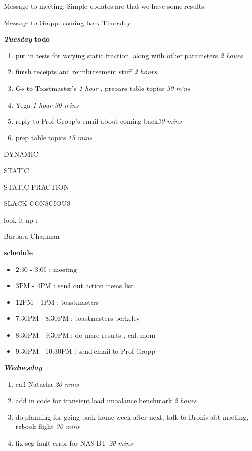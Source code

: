 \documentclass[11pt]{article}
\newcommand{\timeEst}[1]{\textit{#1}}
\begin{document}
Message to meeting: Simple updates are that we have some results

Message to Gropp: coming back Thursday

\textbf{\textit{Tuesday}}
\textbf{todo}
\begin{enumerate}
\item put in tests for varying static fraction, along with other parameters \timeEst{2 hours}
\item finish receipts and reimbursement stuff \timeEst{2 hours}
\item Go to Toastmaster's \timeEst{1 hour} , prepare table topics \timeEst{30 mins}
\item Yoga \timeEst{1 hour 30 mins}
\item reply to Prof Gropp's email about coming back\timeEst{20 mins}
\item prep table topics \timeEst{15 mins}
\end{enumerate}

DYNAMIC

STATIC

STATIC FRACTION

SLACK-CONSCIOUS


look it up :

Barbara Chapman


\textbf{schedule}
\begin{itemize}
\item 2:30 - 3:00 :  meeting
\item 3PM - 4PM : send out action items list
\item 12PM - 1PM : toastmasters
\item 7:30PM - 8:30PM : toastmasters berkeley
\item 8:30PM - 9:30PM :  do more results , call mom
\item 9:30PM - 10:30PM : send email to Prof Gropp
\end{itemize}


\textbf{\textit{Wednesday}}
\begin{enumerate}
\item call Natasha \timeEst{20 mins}



\item add in code for transient load imbalance benchmark \timeEst{2 hours}
\item do planning for going back home week after next, talk to Bronis abt meeting, rebook flight \timeEst{30 mins}
\item fix seg fault error for NAS BT \timeEst{20 mins}
\end{enumerate}
\end{document}
